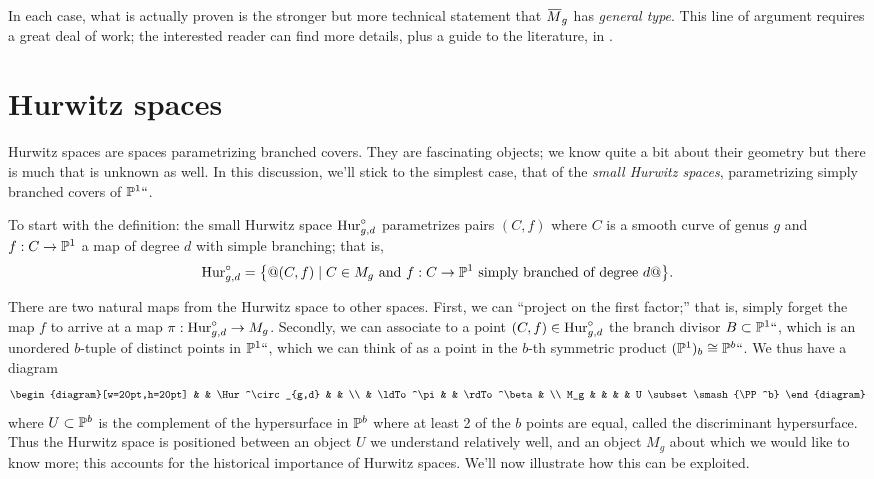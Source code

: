 In each case, what is actually proven is the stronger but more
technical statement that $\ovM_g$ has \emph{general type}.
%
This line of argument requires a great deal of work; the interested reader
can find more details, plus a guide to the literature, in
\cite{MR1631825}.

\section{Hurwitz spaces}\label{Hurwitz spaces}

Hurwitz spaces are spaces parametrizing branched covers. They are fascinating objects; we know quite a bit about their geometry but there is much that is unknown as well. In this discussion, we'll stick to the simplest case, that of the \emph{small Hurwitz spaces}, parametrizing simply branched covers of ${\mathbb P}^1` `$.
%
%

To start with the definition: the small Hurwitz space $\mathrm{Hur}^\circ_{g,d}$ 
% 
parametrizes pairs $(C, f)$ where $C$ is a smooth
curve of genus $g$ and $f : C \to {\mathbb P}^1$ a map of degree $d$ with
simple branching; that is,
$$
\mathrm{Hur}^\circ_{g,d} = \bigl\{@(C, f) \mid C \in M_g  
\text{ and } f:C \to {\mathbb P}^1 \text{ simply branched of degree } d@\bigr\}.
$$

There are two natural maps from the Hurwitz space to other spaces.
First, we can ``project on the first factor;'' that is, simply forget
the map $f$ to arrive at a map $\pi : \mathrm{Hur}^\circ_{g,d} \to M_g$.
Secondly, we can associate to a point $(C,f) \in \mathrm{Hur}^\circ_{g,d}$ the
branch divisor $B \subset {\mathbb P}^1` `$, which is an unordered $b$-tuple
of distinct points in ${\mathbb P}^1` `$, which we can think of as a point in
the $b$-th symmetric product $({\mathbb P}^1)_b  \cong {\mathbb P}^b` `$. We thus have
a diagram 
$$
\begin{diagram}[w=20pt,h=20pt]
& & \Hur^\circ_{g,d} & & \\
& \ldTo^\pi & & \rdTo^\beta & \\
M_g & & & & U \subset \smash{\PP^b}
\end{diagram}
\index{beta@$\beta$ (Hurwicz spaces)}
$$
where $U \subset {\mathbb P}^b$ is the complement of the hypersurface in ${\mathbb P}^{b}$ where at least 2 of the
$b$ points are equal, called the 
discriminant hypersurface.
Thus the Hurwitz space is positioned between an object $U$ we
understand relatively well, and an object $M_g$ about which we would
like to know more; this accounts for the historical importance of
Hurwitz spaces. We'll now illustrate how this can be exploited.

